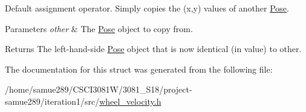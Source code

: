Default assignment operator. Simply copies the (x,y) values of another \hyperlink{structPose}{Pose}. 


\begin{DoxyParams}{Parameters}
{\em other} & The \hyperlink{structPose}{Pose} object to copy from.\\
\hline
\end{DoxyParams}
\begin{DoxyReturn}{Returns}
The left-\/hand-\/side \hyperlink{structPose}{Pose} object that is now identical (in value) to {\ttfamily other}. 
\end{DoxyReturn}


The documentation for this struct was generated from the following file\+:\begin{DoxyCompactItemize}
\item 
/home/samue289/\+C\+S\+C\+I3081\+W/3081\+\_\+\+S18/project-\/samue289/iteration1/src/\hyperlink{wheel__velocity_8h}{wheel\+\_\+velocity.\+h}\end{DoxyCompactItemize}
